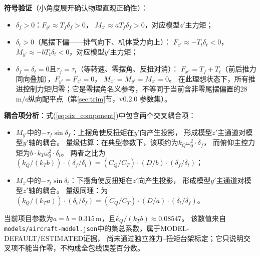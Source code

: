 \textbf{符号验证}（小角度展开确认物理直观正确性）：
\begin{itemize}
    \item $\delta_f > 0$：$F_{y'}\approx T_f\delta_f>0$，
          $M_{z'}\approx aT_f\delta_f>0$，对应模型$z'$主力矩；
    \item $\delta_t > 0$（尾摆下偏——排气向下、机体受力向上）：
          $F_{z'}\approx -T_t\delta_t<0$，
          $M_{y'}\approx -bT_t\delta_t<0$，对应模型$y'$主力矩；
    \item $\delta_f = \delta_t = 0$且$\tau_f = \tau_t$（等转速、零摆角、反扭对消）：
          $F_{x'}=T_f+T_t$（前后推力同向叠加），$F_{y'}=F_{z'}=0$，
          $M_{x'}=M_{y'}=M_{z'}=0$。
          在此理想状态下，所有推进控制力矩归零；它是零摆角名义参考，不等同于当前含非零尾摆偏置的28\,m/s纵向配平点（第\ref{sec:trim}节，v0.2.0 参数集）。
\end{itemize}

\textbf{耦合项分析}：式(\ref{eq:six_component})中包含两个交叉耦合项：
\begin{itemize}
    \item $M_{y'}$中的$-\tau_f \sin\delta_f$：上摆角使反扭矩在$y'$向产生投影，
          形成模型$z'$主通道对模型$y'$轴的耦合。
          量级估算：在典型参数下，该项约为$k_Q \omega_0^2 \cdot \delta_f$，
          而俯仰主控力矩为$b \cdot k_T \omega_0^2 \cdot \delta_t$。
          两者之比为$(k_Q / (k_T b)) \cdot (\delta_f/\delta_t)
          = (C_Q/C_T) \cdot (D/b) \cdot (\delta_f/\delta_t)$；
    \item $M_{z'}$中的$-\tau_t \sin\delta_t$：下摆角使反扭矩在$z'$向产生投影，
          形成模型$y'$主通道对模型$z'$轴的耦合。
          量级同理：为$(k_Q / (k_T a)) \cdot (\delta_t/\delta_f)
          = (C_Q/C_T) \cdot (D/a) \cdot (\delta_t/\delta_f)$。
\end{itemize}

当前项目参数为$a=b=0.315$\,m，且$k_Q/(k_Tb)\approx0.08547$。
该数值来自\texttt{models/aircraft-model.json}中的集总系数，属于MODEL-DEFAULT/ESTIMATED证据，
尚未通过独立推力--扭矩台架标定；它只说明交叉项不能当作零，不构成全包线误差百分数。
